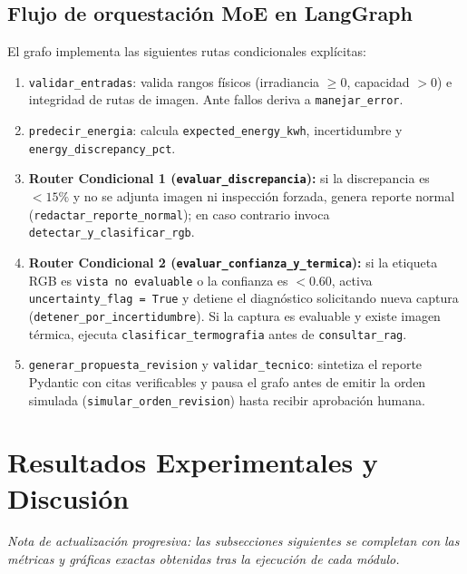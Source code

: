 \documentclass[12pt,a4paper]{article}
\begin{document}
\subsection{Flujo de orquestación MoE en LangGraph}
El grafo implementa las siguientes rutas condicionales explícitas:
\begin{enumerate}
    \item \texttt{validar\_entradas}: valida rangos físicos (irradiancia $\geq 0$, capacidad $> 0$) e integridad de rutas de imagen. Ante fallos deriva a \texttt{manejar\_error}.
    \item \texttt{predecir\_energia}: calcula \texttt{expected\_energy\_kwh}, incertidumbre y \texttt{energy\_discrepancy\_pct}.
    \item \textbf{Router Condicional 1 (\texttt{evaluar\_discrepancia}):} si la discrepancia es $< 15\%$ y no se adjunta imagen ni inspección forzada, genera reporte normal (\texttt{redactar\_reporte\_normal}); en caso contrario invoca \texttt{detectar\_y\_clasificar\_rgb}.
    \item \textbf{Router Condicional 2 (\texttt{evaluar\_confianza\_y\_termica}):} si la etiqueta RGB es \texttt{vista no evaluable} o la confianza es $< 0.60$, activa \texttt{uncertainty\_flag = True} y detiene el diagnóstico solicitando nueva captura (\texttt{detener\_por\_incertidumbre}). Si la captura es evaluable y existe imagen térmica, ejecuta \texttt{clasificar\_termografia} antes de \texttt{consultar\_rag}.
    \item \texttt{generar\_propuesta\_revision} y \texttt{validar\_tecnico}: sintetiza el reporte Pydantic con citas verificables y pausa el grafo antes de emitir la orden simulada (\texttt{simular\_orden\_revision}) hasta recibir aprobación humana.
\end{enumerate}

\section{Resultados Experimentales y Discusión}

\textit{Nota de actualización progresiva: las subsecciones siguientes se completan con las métricas y gráficas exactas obtenidas tras la ejecución de cada módulo.}
\end{document}
